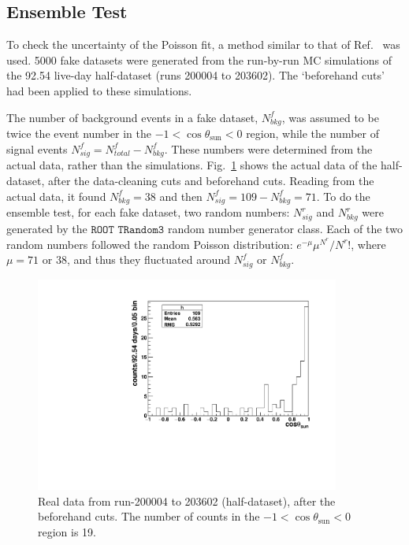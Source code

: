 \subsection{Ensemble Test}\label{sect:ensemble}

To check the uncertainty of the Poisson fit, a method similar to that of Ref.~\cite{leta} was used. 5000 fake datasets were generated from the run-by-run MC simulations of the 92.54 live-day half-dataset (runs 200004 to 203602). The `beforehand cuts' had been applied to these simulations.

The number of background events in a fake dataset, $N^f_{bkg}$, was assumed to be twice the event number in the $-1<\cos\theta_\mathrm{sun}<0$ region, while the number of signal events $N^f_{sig}=N^f_{total}-N^f_{bkg}$. These numbers were determined from the actual data, rather than the simulations. Fig.~\ref{half_data} shows the actual data of the half-dataset, after the data-cleaning cuts and beforehand cuts. Reading from the actual data, it found $N^f_{bkg}=38$ and then $N^f_{sig}=109-N^f_{bkg}=71$. To do the ensemble test, for each fake dataset, two random numbers: $N^r_{sig}$ and $N^r_{bkg}$ were generated by the $\texttt{ROOT TRandom3}$ random number generator class. Each of the two random numbers followed the random Poisson distribution: $e^{-\mu}\mu^{N^r}/N^r!$, where $\mu=71$ or $38$, and thus they fluctuated around $N^f_{sig}$ or $N^f_{bkg}$.

\begin{figure}[!htb]
	\centering
	\includegraphics[width=10cm]{cosThetaToSun_halfData_5to15.pdf}
	\caption[Real data from run-200004 to 203602 (half-dataset), after the beforehand cuts.]{Real data from run-200004 to 203602 (half-dataset), after the beforehand cuts. The number of counts in the $-1<\cos\theta_\mathrm{sun}<0$ region is 19.}
	\label{half_data}
\end{figure}

